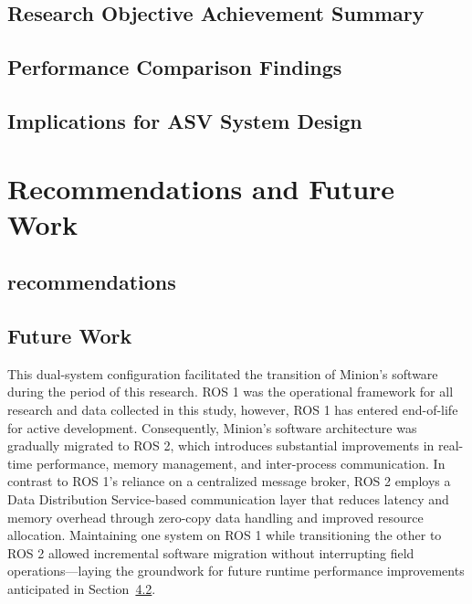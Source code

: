 \documentclass{erauthesis}
\begin{document}
\section{Research Objective Achievement Summary}

\section{Performance Comparison Findings}

\section{Implications for ASV System Design}

\chapter{Recommendations and Future Work} 

\section{recommendations} \label{reccomendations}

\section{Future Work} \label{futurework}

This dual-system configuration facilitated the transition of Minion's software during the period of this research.
\ac{ROS} 1 was the operational framework for all research and data collected in this study, however, \ac{ROS} 1 has entered end-of-life for active development.
Consequently, Minion’s software architecture was gradually migrated to \ac{ROS} 2, which introduces substantial improvements in real-time performance, memory management, and inter-process communication.
In contrast to ROS 1’s reliance on a centralized message broker, ROS 2 employs a Data Distribution Service-based communication layer that reduces latency and memory overhead through zero-copy data handling and improved resource allocation.
Maintaining one system on ROS 1 while transitioning the other to ROS 2 allowed incremental software migration without interrupting field operations—laying the groundwork for future runtime performance improvements anticipated in Section~\ref{futurework}.
\end{document}
